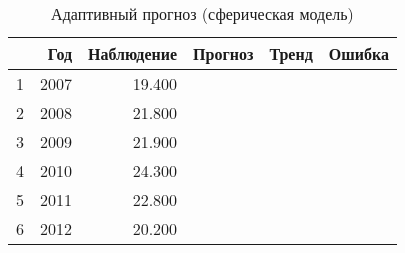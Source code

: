 \begin{table}[ht]
\centering
\begin{tabular}{rrrrrr}
  \hline
 & Год & Наблюдение & Прогноз & Тренд & Ошибка \\ 
  \hline
1 & 2007 & 19.400 &  &  &  \\ 
  2 & 2008 & 21.800 &  &  &  \\ 
  3 & 2009 & 21.900 &  &  &  \\ 
  4 & 2010 & 24.300 &  &  &  \\ 
  5 & 2011 & 22.800 &  &  &  \\ 
  6 & 2012 & 20.200 &  &  &  \\ 
   \hline
\end{tabular}
\caption{Адаптивный прогноз (сферическая модель)} 
\label{table:sph-fit-adapt-prediction}
\end{table}
